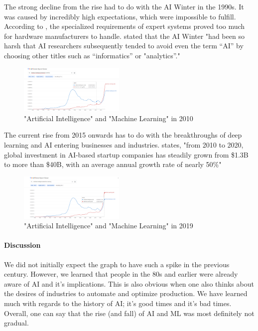 \documentclass[11pt]{article}
\begin{document}
{The strong decline from the rise had to do with the AI Winter in the 1990s. It was caused by incredibly high expectations, which were impossible to fulfill. According to \citep{PET:2021}, the specialized requirements of expert systems proved too much for hardware manufacturers to handle. \cite{PET:2021} stated that the AI Winter "had been so harsh that AI researchers subsequently tended to avoid even the term “AI” by choosing other titles such as “informatics” or "analytics”."

\begin{figure}
  \centering
  \includegraphics[width=0.45\textwidth]{Screenshot 2024-01-16 220127.png}
  \caption{"Artificial Intelligence" and "Machine Learning" in 2010}
  \label{fig:ngram1}
\end{figure}

The current rise from 2015 onwards has to do with the breakthroughs of deep learning and AI entering businesses and industries. \cite{PET:2021} states, "from 2010 to 2020, global investment in AI-based startup companies has steadily grown from \$1.3B to more than \$40B, with an average annual growth rate of nearly 50\%"

\begin{figure}
  \centering
  \includegraphics[width=0.45\textwidth]{Screenshot 2024-01-13 211035.png}
  \caption{"Artificial Intelligence" and "Machine Learning" in 2019}
  \label{fig:ngram1}
\end{figure}

\paragraph{Discussion}
We did not initially expect the graph to have such a spike in the previous century. However, we learned that people in the 80s and earlier were already aware of AI and it's implications. This is also obvious when one also thinks about the desires of industries to automate and optimize production. We have learned much with regards to the history of AI; it's good times and it's bad times. Overall, one can say that the rise (and fall) of AI and ML was most definitely not gradual.

}
\end{document}
